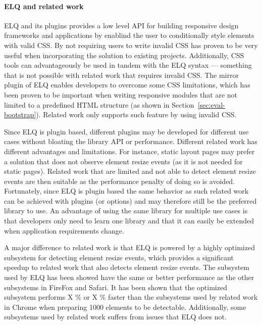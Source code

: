 \documentclass[a4paper,11pt]{kth-mag}
\begin{document}
    \paragraph{ELQ and related work}
    ELQ and its plugins provides a low level API for building responsive design frameworks and applications by enablind the user to conditionally style elements with valid CSS.
    By not requiring users to write invalid CSS has proven to be very useful when incorporating the solution to existing projects.
    Additionally, CSS tools can advantageously be used in tandem with the ELQ syntax --- something that is not possible with related work that requires invalid CSS.
    The mirror plugin of ELQ enables developers to overcome some CSS limitations, which has been proven to be important when writing responsive modules that are not limited to a predefined \gls{HTML} structure (as shown in Section~\ref{sec:eval-bootstrap}).
    Related work only supports such feature by using invalid CSS.

    Since ELQ is plugin based, different plugins may be developed for different use cases without bloating the library API or performance.
    Different related work has different advantages and limitations.
    For instance, static layout pages may prefer a solution that does not observe element resize events (as it is not needed for static pages).
    Related work that are limited and not able to detect element resize events are then suitable as the performance penalty of doing so is avoided.
    Fortunately, since ELQ is plugin based the same behavior as such related work can be achieved with plugins (or options) and may therefore still be the preferred library to use.
    An advantage of using the same library for multiple use cases is that developers only need to learn one library and that it can easily be extended when application requirements change.

    A major difference to related work is that ELQ is powered by a highly optimized subsystem for detecting element resize events, which provides a significant speedup to related work that also detects element resize events.
    The subsystem used by ELQ has been showed have the same or better performance as the other subsystems in FireFox and Safari.
    It has been shown that the optimized subsystem performs X \% or X \% faster than the subsystems used by related work in Chrome when preparing 1000 elements to be detectable.
    Additionally, some subsystems used by related work suffers from issues that ELQ does not.
\end{document}
